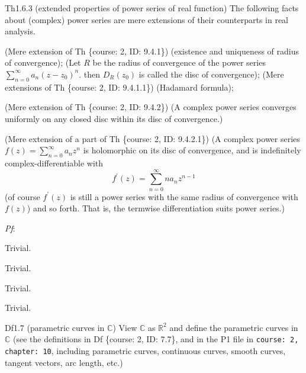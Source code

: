 \documentclass{article}
\begin{document}
\begin{Th}{Th1.6.3 (extended properties of power series of real function)}
    The following facts about (complex) power series are mere extensions of their counterparts in real analysis.
    \begin{compactenum}
        \item (Mere extension of Th \{course: 2, ID: 9.4.1\}) (existence and uniqueness of \textcolor{Df}{radius of convergence}); \textcolor{Df}{(Let $R$ be the radius of convergence of the power series $\sum_{n=0}^{\infty} a_n(z-z_0)^n$. then $D_R(z_0)$ is called the disc of convergence)}; (Mere extensions of Th \{course: 2, ID: 9.4.1.1\}) (Hadamard formula);
        \item (Mere extension of Th \{course: 2, ID: 9.4.2\}) (A complex power series converges uniformly on any closed disc within its disc of convergence.)
        \item (Mere extension of a part of Th \{course: 2, ID: 9.4.2.1\}) (A complex power series $f(z) = \sum_{n=0}^{\infty} a_nz^n$ is holomorphic on its disc of convergence, and is indefinitely complex-differentiable with
        $$ f^\prime (z) = \sum_{n=0}^{\infty} na_nz^{n-1} $$
        (of course $f^\prime (z)$ is still a power series with the same radius of convergence with $f(z)$) and so forth. That is, the termwise differentiation suits power series.)
    \end{compactenum}
    \tcblower
    \textit{Pf}: 
    \begin{compactenum}
        \item Trivial.
        \item Trivial.
        \item Trivial.
        \item Trivial.
    \end{compactenum}
\end{Th}

\begin{Df}{Df1.7 (parametric curves in $\mathbb{C}$)}
    View $\mathbb{C}$ as $\mathbb{R}^2$ and define the parametric curves in $\mathbb{C}$ (see the definitions in Df \{course: 2, ID: 7.7\}, and in the P1 file in \verb|course: 2, chapter: 10|, including parametric curves, continuous curves, smooth curves, tangent vectors, arc length, etc.)
\end{Df}
\end{document}
